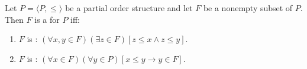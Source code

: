 Let $P = \langle P, \leq \rangle$ be a partial order structure and let $F$ be a nonempty subset of $P$. Then $F$ is a  for $P$ iff:
\begin{enumerate}
\item $F$ is : $(\forall x, y \in F)(\exists z \in F)[z \leq x \wedge z \leq y]$.
\item $F$ is : $(\forall x \in F)(\forall y \in P)[x \leq y \rightarrow y \in F]$.
\end{enumerate}
